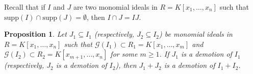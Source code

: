 \documentclass[11pt]{amsart}
\newtheorem{proposition}[theorem]{Proposition}
\begin{document}

Recall that if $I$ and $J$ are two monomial ideals in $R=K[x_1, \ldots, x_n]$ such that $\mathrm{supp}(I) \cap \mathrm{supp}(J)= \emptyset$, then 
 $I\cap J=IJ$. 

\begin{proposition} \label{Summation}
 Let $J_1 \subseteq I_1$ (respectively,  $J_2 \subseteq I_2$)  be monomial ideals  in $R=K[x_1, \ldots, x_n]$ such that 
$\mathcal{G}(I_1) \subset R_1=K[x_1, \ldots, x_m]$ and $\mathcal{G}(I_2) \subset R_2=K[x_{m+1}, \ldots, x_n]$ for some $m \geq 1$. 
 If  $J_1$ is  a demotion of $I_1$ (respectively,  $J_2$ is  a demotion of $I_2$), then   $J_1+J_2$ is  a demotion of $I_1+I_2$. 
\end{proposition}
\end{document}
